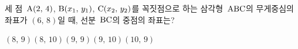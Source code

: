 세 점~$\mathrm{A}(2,\,4)$, $\mathrm{B}(x_1,\,y_1)$, $\mathrm{C}(x_2,\,y_2)$를 꼭짓점으로 하는 삼각형~$\mathrm{ABC}$의 무게중심의 좌표가 $(6,\,8)$일 때, 선분~$\mathrm{BC}$의 중점의 좌표는?
\begin{choices32}{$(8,\,9)$}{$(8,\,10)$}{$(9,\,9)$}{$(9,\,10)$}{$(10,\,9)$}\end{choices32}

